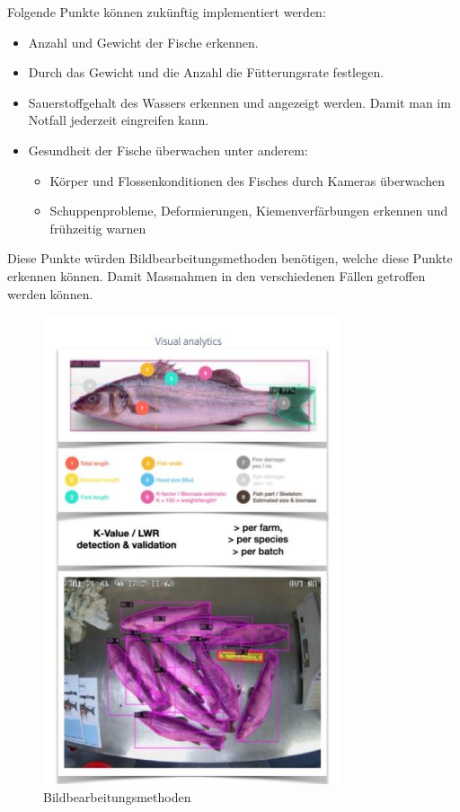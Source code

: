 \documentclass[../main.tex]{subfiles}
\begin{document}
	Folgende Punkte können zukünftig implementiert werden:
	\begin{itemize}
		\item Anzahl und Gewicht der Fische erkennen.
		\item Durch das Gewicht und die Anzahl die Fütterungsrate festlegen.
		\item Sauerstoffgehalt des Wassers erkennen und angezeigt werden. Damit man im Notfall jederzeit eingreifen kann.
		\item Gesundheit der Fische überwachen unter anderem:
		\begin{itemize}
			\item Körper und Flossenkonditionen des Fisches durch Kameras überwachen
			\item Schuppenprobleme, Deformierungen, Kiemenverfärbungen erkennen und frühzeitig warnen
		\end{itemize}
	\end{itemize}	
	Diese Punkte würden Bildbearbeitungsmethoden benötigen, welche diese Punkte erkennen können. Damit Massnahmen in den verschiedenen Fällen getroffen werden können. 
	\par 
	\begin{figure}[H]
		\centering
		\includegraphics{../images/Imageprocessing}
		\caption{Bildbearbeitungsmethoden}
		\label{fig:Imageprocessing}
	\end{figure}
	
\end{document}
